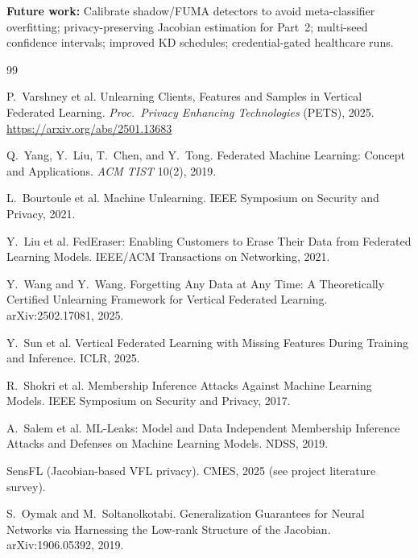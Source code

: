 \documentclass[sigconf,nonacm]{acmart}
\begin{document}
\textbf{Future work:} Calibrate shadow/FUMA detectors to avoid meta-classifier overfitting; privacy-preserving Jacobian estimation for Part~2; multi-seed confidence intervals; improved KD schedules; credential-gated healthcare runs.





\clearpage





\begin{thebibliography}{99}

P.~Varshney et al.
\newblock Unlearning Clients, Features and Samples in Vertical Federated Learning.
\newblock \emph{Proc.\ Privacy Enhancing Technologies} (PETS), 2025.
\newblock \url{https://arxiv.org/abs/2501.13683}

Q.~Yang, Y.~Liu, T.~Chen, and Y.~Tong.
\newblock Federated Machine Learning: Concept and Applications.
\newblock \emph{ACM TIST} 10(2), 2019.

L.~Bourtoule et al.
\newblock Machine Unlearning.
\newblock IEEE Symposium on Security and Privacy, 2021.

Y.~Liu et al.
\newblock FedEraser: Enabling Customers to Erase Their Data from Federated Learning Models.
\newblock IEEE/ACM Transactions on Networking, 2021.

Y.~Wang and Y.~Wang.
\newblock Forgetting Any Data at Any Time: A Theoretically Certified Unlearning Framework for Vertical Federated Learning.
\newblock arXiv:2502.17081, 2025.

Y.~Sun et al.
\newblock Vertical Federated Learning with Missing Features During Training and Inference.
\newblock ICLR, 2025.

R.~Shokri et al.
\newblock Membership Inference Attacks Against Machine Learning Models.
\newblock IEEE Symposium on Security and Privacy, 2017.

A.~Salem et al.
\newblock ML-Leaks: Model and Data Independent Membership Inference Attacks and Defenses on Machine Learning Models.
\newblock NDSS, 2019.

SensFL (Jacobian-based VFL privacy).
\newblock CMES, 2025 (see project literature survey).

S.~Oymak and M.~Soltanolkotabi.
\newblock Generalization Guarantees for Neural Networks via Harnessing the Low-rank Structure of the Jacobian.
\newblock arXiv:1906.05392, 2019.


\end{thebibliography}
\end{document}

